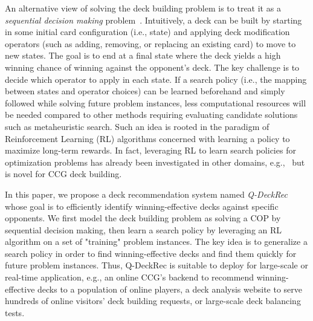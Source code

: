 



An alternative view of solving the deck building problem is to treat it as a \textit{sequential decision making} problem~\cite{littman1996algorithms}.
Intuitively, a deck can be built by starting in some initial card configuration (i.e., state) and applying deck modification operators (such as adding, removing, or replacing an existing card) to move to new states. The goal is to end at a final state where the deck yields a high winning chance of winning against the opponent's deck. The key challenge is to decide which operator to apply in each state.  If a search policy (i.e., the mapping between states and operator choices) can be learned beforehand and simply followed while solving future problem instances, less computational resources will be needed compared to other methods requiring evaluating candidate solutions such as metaheuristic search. Such an idea is rooted in the paradigm of Reinforcement Learning (RL) algorithms concerned with learning a policy to maximize long-term rewards. In fact, leveraging RL to learn search policies for optimization problems has already been investigated in other domains, e.g.,~\cite{zhang2000solving,gaudel2010feature,zoph2016neural} but is novel for CCG deck building.




In this paper, we propose a deck recommendation system named \textit{Q-DeckRec} whose goal is to efficiently identify winning-effective decks against specific opponents. We first model the deck building problem as solving a COP by sequential decision making, then learn a search policy by leveraging an RL algorithm on a set of "training" problem instances. The key idea is to generalize a search policy in order to find winning-effective decks and find them quickly for future problem instances. Thus, Q-DeckRec is suitable to deploy for large-scale or real-time application, e.g., an online CCG's backend to recommend winning-effective decks to a population of online players, a deck analysis website to serve hundreds of online visitors' deck building requests, or large-scale deck balancing tests. 



